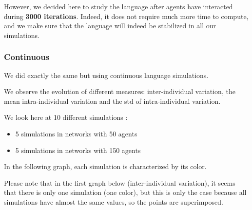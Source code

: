 \documentclass[
]{article}
\providecommand{\tightlist}{%
  \setlength{\itemsep}{0pt}\setlength{\parskip}{0pt}}
\begin{document}
However, we decided here to study the language after agents have
interacted during \textbf{3000 iterations}. Indeed, it does not require
much more time to compute, and we make sure that the language will
indeed be stabilized in all our simulations.

\hypertarget{continuous}{%
\subsubsection{Continuous}\label{continuous}}

We did exactly the same but using continuous language simulations.

We observe the evolution of different measures: inter-individual
variation, the mean intra-individual variation and the std of
intra-individual variation.

We look here at 10 different simulations :

\begin{itemize}
\tightlist
\item
  5 simulations in networks with 50 agents
\item
  5 simulations in networks with 150 agents
\end{itemize}

In the following graph, each simulation is characterized by its color.

Please note that in the first graph below (inter-individual variation),
it seems that there is only one simulation (one color), but this is only
the case because all simulations have almost the same values, so the
points are superimposed.
\end{document}
